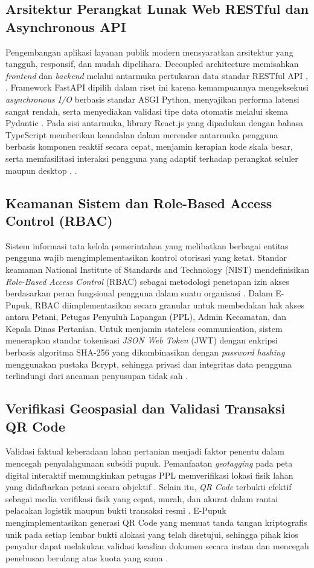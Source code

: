 \documentclass[conference]{IEEEtran}
\begin{document}
\subsection{Arsitektur Perangkat Lunak Web RESTful dan Asynchronous API}
Pengembangan aplikasi layanan publik modern mensyaratkan arsitektur yang tangguh, responsif, dan mudah dipelihara. Decoupled architecture memisahkan \textit{frontend} dan \textit{backend} melalui antarmuka pertukaran data standar RESTful API \cite{b8}, \cite{b9}. Framework FastAPI dipilih dalam riset ini karena kemampuannya mengeksekusi \textit{asynchronous I/O} berbasis standar ASGI Python, menyajikan performa latensi sangat rendah, serta menyediakan validasi tipe data otomatis melalui skema Pydantic \cite{b8}. Pada sisi antarmuka, library React.js yang dipadukan dengan bahasa TypeScript memberikan keandalan dalam merender antarmuka pengguna berbasis komponen reaktif secara cepat, menjamin kerapian kode skala besar, serta memfasilitasi interaksi pengguna yang adaptif terhadap perangkat seluler maupun desktop \cite{b9}, \cite{b15}.

\subsection{Keamanan Sistem dan Role-Based Access Control (RBAC)}
Sistem informasi tata kelola pemerintahan yang melibatkan berbagai entitas pengguna wajib mengimplementasikan kontrol otorisasi yang ketat. Standar keamanan National Institute of Standards and Technology (NIST) mendefinisikan \textit{Role-Based Access Control} (RBAC) sebagai metodologi penetapan izin akses berdasarkan peran fungsional pengguna dalam suatu organisasi \cite{b10}. Dalam E-Pupuk, RBAC diimplementasikan secara granular untuk membedakan hak akses antara Petani, Petugas Penyuluh Lapangan (PPL), Admin Kecamatan, dan Kepala Dinas Pertanian. Untuk menjamin stateless communication, sistem menerapkan standar tokenisasi \textit{JSON Web Token} (JWT) dengan enkripsi berbasis algoritma SHA-256 yang dikombinasikan dengan \textit{password hashing} menggunakan pustaka Bcrypt, sehingga privasi dan integritas data pengguna terlindungi dari ancaman penyusupan tidak sah \cite{b11}.

\subsection{Verifikasi Geospasial dan Validasi Transaksi QR Code}
Validasi faktual keberadaan lahan pertanian menjadi faktor penentu dalam mencegah penyalahgunaan subsidi pupuk. Pemanfaatan \textit{geotagging} pada peta digital interaktif memungkinkan petugas PPL memverifikasi lokasi fisik lahan yang didaftarkan petani secara objektif \cite{b7}. Selain itu, \textit{QR Code} terbukti efektif sebagai media verifikasi fisik yang cepat, murah, dan akurat dalam rantai pelacakan logistik maupun bukti transaksi resmi \cite{b12}. E-Pupuk mengimplementasikan generasi QR Code yang memuat tanda tangan kriptografis unik pada setiap lembar bukti alokasi yang telah disetujui, sehingga pihak kios penyalur dapat melakukan validasi keaslian dokumen secara instan dan mencegah penebusan berulang atas kuota yang sama \cite{b12}.
\end{document}
